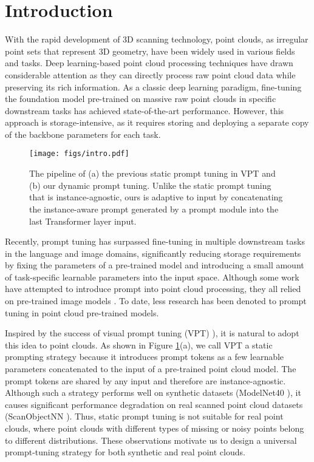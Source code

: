 \documentclass[10pt,twocolumn,letterpaper]{article}
\begin{document}
\section{Introduction}

With the rapid development of 3D scanning technology, point clouds, as irregular point sets that represent 3D geometry, have been widely used in various fields and tasks. Deep learning-based point cloud processing techniques  \cite{guo2021pct,li2018pointcnn,ma2022rethinking,qi2017pointnet,qi2017pointnet++,wang2019dynamic,ReCon} have drawn considerable attention as they can directly process raw point cloud data while preserving its rich information. As a classic deep learning paradigm, fine-tuning the foundation model pre-trained \cite{dong2022autoencoders,liu2022masked,pang2022masked,yu2022point,zhang2022point} on massive raw point clouds in specific downstream tasks has achieved state-of-the-art performance. However, this approach is storage-intensive, as it requires storing and deploying a separate copy of the backbone parameters for each task.

\begin{figure}[t]
\centering
\texttt{[image: figs/intro.pdf]} 
\caption{The pipeline of (a) the previous static prompt tuning in VPT \cite{jia2022visual} and (b) our dynamic prompt tuning. Unlike the static prompt tuning that is instance-agnostic, ours is adaptive to input by concatenating the instance-aware prompt generated by a prompt module into the last Transformer layer input.}
\label{intro}
\end{figure}

Recently, prompt tuning has surpassed fine-tuning in multiple downstream tasks in the language and image domains, significantly reducing storage requirements by fixing the parameters of a pre-trained model and introducing a small amount of task-specific learnable parameters into the input space. Although some work \cite{huang2022frozen,huang2022clip2point,wang2022p2p,zhang2022pointclip} have attempted  to introduce prompt into point cloud processing, they all relied on pre-trained image models \cite{radford2021learning,dosovitskiy2020image}.
To date, less research has been denoted to  prompt tuning in point cloud pre-trained models.

Inspired by the success of visual prompt tuning (VPT) \cite{jia2022visual}),  it is natural to adopt this idea to point clouds. 
As shown in Figure \ref{intro}(a), we call VPT a static prompting strategy because it introduces prompt tokens as a few learnable parameters concatenated to the input of a pre-trained point cloud model. 
The prompt tokens are shared by any input and therefore are instance-agnostic. 
Although such a strategy performs well on synthetic datasets (\eg ModelNet40 \cite{wu20153d}), it causes significant performance degradation on real scanned point cloud datasets (\eg ScanObjectNN \cite{uy2019revisiting}). Thus, static prompt tuning is not suitable for real point clouds,  where point clouds with different types of missing or noisy points belong to different distributions. These observations motivate us to  design a universal prompt-tuning strategy for both synthetic and real point clouds.
\end{document}
